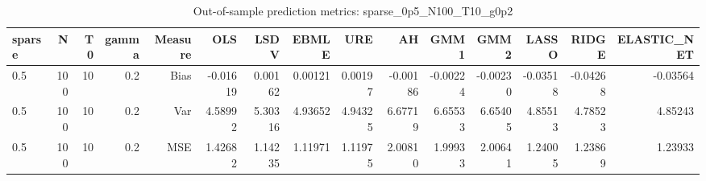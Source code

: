 \begin{table}[!htbp]\centering
\caption{Out-of-sample prediction metrics: sparse_0p5_N100_T10_g0p2}
\label{tab:table3_sparse_0p5_N100_T10_g0p2}
\begin{tabular}{lrrrrrrrrrrrrrr}
\hline
sparse & N & T0 & gamma & Measure & OLS & LSDV & EBMLE & URE & AH & GMM1 & GMM2 & LASSO & RIDGE & ELASTIC_NET \\
\hline
0.5 & 100 & 10 & 0.2 & Bias & -0.01619 & 0.00162 & 0.00121 & 0.00197 & -0.00186 & -0.00224 & -0.00230 & -0.03518 & -0.04268 & -0.03564 \\
0.5 & 100 & 10 & 0.2 & Var & 4.58992 & 5.30316 & 4.93652 & 4.94325 & 6.67719 & 6.65533 & 6.65405 & 4.85513 & 4.78523 & 4.85243 \\
0.5 & 100 & 10 & 0.2 & MSE & 1.42682 & 1.14235 & 1.11971 & 1.11975 & 2.00810 & 1.99933 & 2.00641 & 1.24005 & 1.23869 & 1.23933 \\
\hline
\end{tabular}
\end{table}

